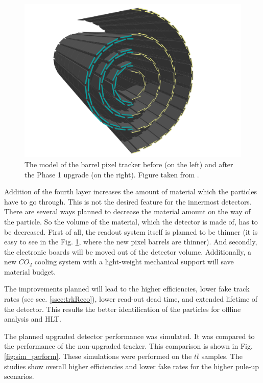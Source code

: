 \begin{figure}[t]
 \centering
 \includegraphics[width=1.0\textwidth]{021_pixel_upgrade/plots/pixel_phase1_4_layers.png}
 \caption{The model of the barrel pixel tracker before (on the left) and after the Phase 1 upgrade (on the right). Figure taken from
 \cite{CMS:2012sda}.}
 \label{fig:tracker_4}
\end{figure}

Addition of the fourth layer increases the amount of material which the particles have to go through. This is not
the desired feature for the innermost detectors. There are several ways planned to decrease the material amount on the 
way of the particle. So the volume of the material, which the detector is made of, has to be decreased. 
First of all, the readout system itself is planned to be thinner (it is easy to see in the Fig. \ref{fig:tracker_4},
where the new pixel barrels are thinner). And secondly, the electronic boards will be moved out of the detector volume. 
Additionally, a new $CO_{2}$ cooling system \cite{CMS:2012sda} with a light-weight mechanical support will save material budget.

The improvements planned will lead to the higher efficiencies, lower fake track rates (see sec. \ref{ssec:trkReco}), lower read-out dead time,
and extended lifetime of the detector. This results the better identification of the particles for offline analysis and HLT.

The planned upgraded detector performance was simulated. It was compared to the performance of the non-upgraded tracker. This comparison
is shown in Fig. \ref{fig:sim_perform}. These simulations were performed on the $t\bar{t}$ samples. The studies show overall higher 
efficiencies and lower fake rates for the higher pule-up scenarios.

